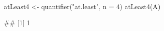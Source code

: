 \begin{Schunk}
% --begin: "quant7"
\begin{Sinput}
atLeast4 <- quantifier("at.least", n = 4)
atLeast4(A)
\end{Sinput}
\begin{Soutput}
## [1] 1
\end{Soutput}
%
% --end: "quant7"
\end{Schunk}
